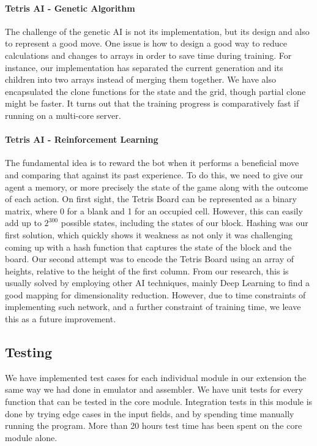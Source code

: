 \documentclass[11pt]{article}
\begin{document}
\paragraph{Tetris AI - Genetic Algorithm}
\begin{flushleft}
The challenge of the genetic AI is not its implementation, but its design and also to represent a good move. One issue is how to design a good way to reduce calculations and changes to arrays in order to save time during training. For instance, our implementation has separated the current generation and its children into two arrays instead of merging them together. We have also encapsulated the clone functions for the state and the grid, though partial clone might be faster. It turns out that the training progress is comparatively fast if running on a multi-core server.
\end{flushleft}


\paragraph{Tetris AI - Reinforcement Learning}
\begin{flushleft}
The fundamental idea is to reward the bot when it performs a beneficial move and comparing that against its past experience. To do this, we need to give our agent a memory, or more precisely the state of the game along with the outcome of each action. On first sight, the Tetris Board can be represented as a binary matrix, where 0 for a blank and 1 for an occupied cell. However, this can easily add up to ${2^{300}}$ possible states, including the states of our block. Hashing was our first solution, which quickly shows it weakness as not only it was challenging coming up with a hash function that captures the state of the block and the board. Our second attempt was to encode the Tetris Board using an array of heights, relative to the height of the first column. From our research, this is usually solved by employing other AI techniques, mainly Deep Learning to find a good mapping for dimensionality reduction. However, due to time constraints of implementing such network, and a further constraint of training time, we leave this as a future improvement.
\end{flushleft}

    

\subsection{Testing}
\begin{flushleft}
We have implemented test cases for each individual module in our extension the same way we had done in emulator and assembler. We have unit tests for every function that can be tested in the core module. Integration tests in this module is done by trying edge cases in the input fields, and by spending time manually running the program. More than 20 hours test time has been spent on the core module alone. 
\end{flushleft}
\end{document}
